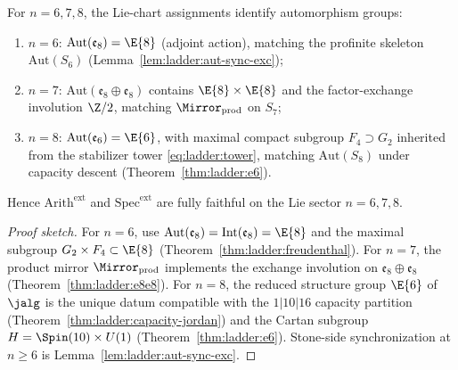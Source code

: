 \begin{lemma}\label{lem:void-mirror:aut-ext}
For $n=6,7,8$, the Lie-chart assignments identify automorphism groups:
\begin{enumerate}[label=(\roman*),leftmargin=*]
  \item $n=6$: $\mathrm{Aut}(\mathfrak{e}_8)=\E{8}$ (adjoint action), matching
    the profinite skeleton $\mathrm{Aut}(S_6)$
    (Lemma~\ref{lem:ladder:aut-sync-exc});
  \item $n=7$: $\mathrm{Aut}(\mathfrak{e}_8\oplus\mathfrak{e}_8)$ contains
    $\E{8}\times\E{8}$ and the factor-exchange involution $\Z/2$, matching
    $\Mirror_{\mathrm{prod}}$ on $S_7$;
  \item $n=8$: $\mathrm{Aut}(\mathfrak{e}_6)=\E{6}$, with maximal compact
    subgroup $F_4\supset G_2$ inherited from the stabilizer tower
    \eqref{eq:ladder:tower}, matching $\mathrm{Aut}(S_8)$ under capacity
    descent (Theorem~\ref{thm:ladder:e6}).
\end{enumerate}
Hence $\mathrm{Arith}^{\mathrm{ext}}$ and $\mathrm{Spec}^{\mathrm{ext}}$ are
fully faithful on the Lie sector $n=6,7,8$.
\end{lemma}

\begin{proof}[Proof sketch]
For $n=6$, use $\mathrm{Aut}(\mathfrak{e}_8)=\mathrm{Int}(\mathfrak{e}_8)=\E{8}$
and the maximal subgroup $G_2\times F_4\subset\E{8}$
(Theorem~\ref{thm:ladder:freudenthal}). For $n=7$, the product mirror
$\Mirror_{\mathrm{prod}}$ implements the exchange involution on
$\mathfrak{e}_8\oplus\mathfrak{e}_8$ (Theorem~\ref{thm:ladder:e8e8}). For
$n=8$, the reduced structure group $\E{6}$ of $\jalg$ is the unique datum
compatible with the $1|10|16$ capacity partition
(Theorem~\ref{thm:ladder:capacity-jordan}) and the Cartan subgroup
$H=\Spin(10)\times U(1)$ (Theorem~\ref{thm:ladder:e6}). Stone-side
synchronization at $n\geq6$ is
Lemma~\ref{lem:ladder:aut-sync-exc}.
\end{proof}

